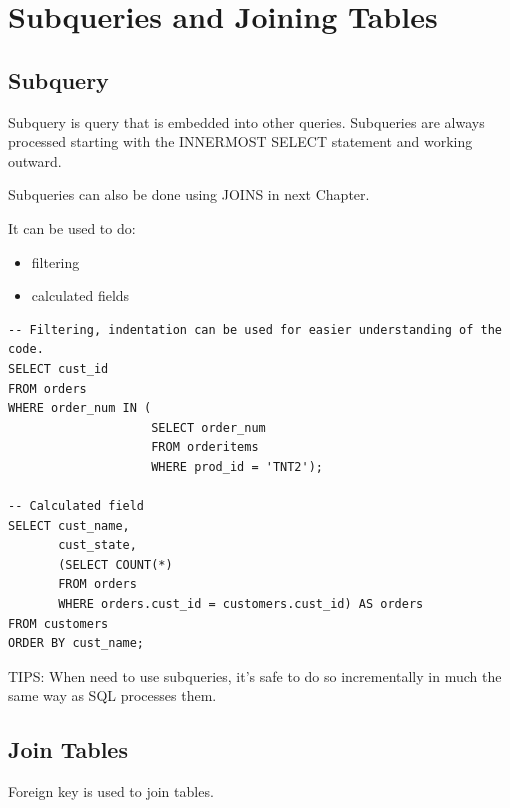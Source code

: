\documentclass[12pt,oneside,a4paper]{article}
\begin{document}
\section{Subqueries and Joining Tables}

\subsection{Subquery}
Subquery is query that is embedded into other queries. Subqueries are always processed starting with the INNERMOST \textsf{SELECT} statement and working outward. 

Subqueries can also be done using JOINS in next Chapter. 

It can be used to do: 
\begin{itemize}
\item filtering

\item calculated fields 
\end{itemize}

\begin{lstlisting}
-- Filtering, indentation can be used for easier understanding of the code. 
SELECT cust_id 
FROM orders 
WHERE order_num IN (
                    SELECT order_num 
                    FROM orderitems
                    WHERE prod_id = 'TNT2');
                    
-- Calculated field 
SELECT cust_name, 
       cust_state,
       (SELECT COUNT(*) 
       FROM orders
       WHERE orders.cust_id = customers.cust_id) AS orders
FROM customers
ORDER BY cust_name;                    
\end{lstlisting}

TIPS: When need to use subqueries, it's safe to do so incrementally in much the same way as SQL processes them. 


\subsection{Join Tables}
Foreign key is used to join tables. 
\end{document}
